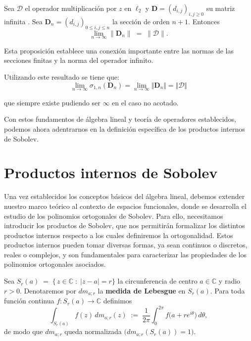 \begin{proposition}\label{prop:singular_values_limit}
	Sea $\mathcal{D}$ el operador multiplicación por $z$ en
	$\ell_2$ y
	$\mathbf{D}=(d_{i,j})_{i,j\ge0}$ su matriz infinita
	. Sea
	$\mathbf{D}_n=(d_{i,j})_{0\le i,j\le n}$ la sección de orden $n+1$. Entonces
	\[
		\lim_{n\to\infty}\|\mathbf{D}_n\|
		\;=\;\|\mathcal{D}\|.
	\]
\end{proposition}

Esta proposición establece una conexión importante entre las normas de las secciones finitas y la norma del operador infinito.

\noindent Utilizando este resultado se tiene que:
$$
	\lim_{n\to \infty} \sigma_{1,n}(\mathbf{D}_n)= \lim_{n \to \infty} \Vert \mathbf{D}_n\Vert= \Vert \mathcal{D}\Vert
$$

\noindent que siempre existe pudiendo ser $\infty$ en el caso no acotado.

Con estos fundamentos de álgebra lineal y teoría de operadores establecidos, podemos ahora adentrarnos en la definición específica de los productos internos de Sobolev.

\section{Productos internos de Sobolev}

\noindent Una vez establecidos los conceptos básicos del álgebra lineal, debemos extender nuestro marco teórico al contexto de espacios funcionales, donde se desarrolla el estudio de los polinomios ortogonales de Sobolev. Para ello, necesitamos introducir los productos de Sobolev, que nos permitirán formalizar los distintos productos internos respecto a los cuales definiremos la ortogonalidad. Estos productos internos pueden tomar diversas formas, ya sean continuos o discretos, reales o complejos, y son fundamentales para caracterizar las propiedades de los polinomios ortogonales asociados.

\begin{definition}\label{def:circum_lebesgue_measure}
	Sea
	\(
	S_{r}(a)\;=\;\bigl\{\,z\in\mathbb{C}\;:\;|z-a|=r\bigr\}
	\)
	la circunferencia de centro \(a\in\mathbb{C}\) y radio \(r>0\).
	Denotaremos por \(dm_{a;r}\) la \textbf{medida de Lebesgue} en \(S_{r}(a)\).
	Para toda función continua \(f:S_{r}(a)\to\mathbb{C}\) definimos
	$$
		\int_{S_{r}(a)} f(z)\,dm_{a;r}(z)
		\;:=\;
		\frac{1}{2\pi}\int_{0}^{2\pi} f\!\bigl(a+re^{i\theta}\bigr)\,d\theta,
	$$
	de modo que \(dm_{a;r}\) queda normalizada
	\(\bigl(dm_{a;r}(S_{r}(a))=1\bigr)\).
\end{definition}

